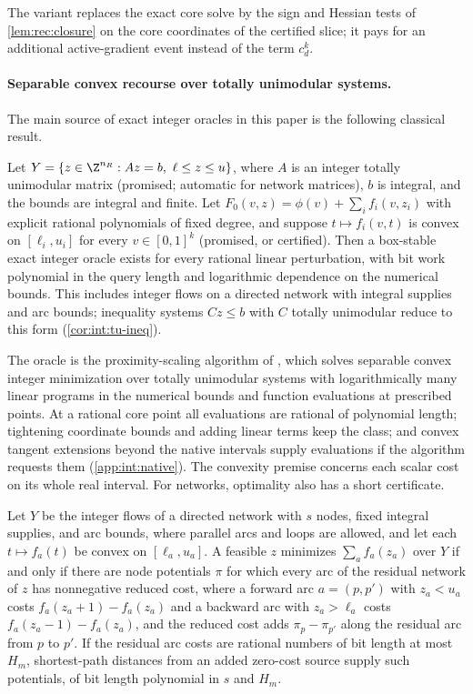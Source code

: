 The variant replaces the exact core solve by the sign and Hessian tests of
\cref{lem:rec:closure} on the core coordinates of the certified slice; it pays
for an additional active-gradient event instead of the term $c_d^k$.

\paragraph{Separable convex recourse over totally unimodular systems.}
The main source of exact integer oracles in this paper is the following
classical result.

\begin{proposition}\label{prop:int:hs}
Let $Y=\{z\in\Z^{n_R}:Az=b,\ \ell\le z\le u\}$, where $A$ is an integer
totally unimodular matrix (promised; automatic for network matrices), $b$ is
integral, and the bounds are integral and finite. Let
$F_0(v,z)=\phi(v)+\sum_if_i(v,z_i)$ with explicit rational polynomials of
fixed degree, and suppose $t\mapsto f_i(v,t)$ is convex on $[\ell_i,u_i]$ for
every $v\in[0,1]^k$ (promised, or certified). Then a box-stable exact integer
oracle exists for every rational linear perturbation, with bit work
polynomial in the query length and logarithmic dependence on the numerical
bounds. This includes integer flows on a directed network with integral
supplies and arc bounds; inequality systems $Cz\le b$ with $C$ totally
unimodular reduce to this form (\cref{cor:int:tu-ineq}).
\end{proposition}

The oracle is the proximity-scaling algorithm of
\citet[Theorem~4.3]{hochbaum1990-convex-separable-optimization-is-not}, which solves separable convex
integer minimization over totally unimodular systems with logarithmically
many linear programs in the numerical bounds and function evaluations at
prescribed points. At a rational core point all evaluations are rational of
polynomial length; tightening coordinate bounds and adding linear terms keep
the class; and convex tangent extensions beyond the native intervals supply
evaluations if the algorithm requests them
(\cref{app:int:native}). The convexity premise concerns each scalar cost on its
whole real interval. For networks, optimality also has a short certificate.

\begin{lemma}\label{lem:int:potentials}
Let $Y$ be the integer flows of a directed network with $s$ nodes, fixed
integral supplies, and arc bounds, where parallel arcs and loops are allowed,
and let each $t\mapsto f_a(t)$ be convex on $[\ell_a,u_a]$. A feasible $z$
minimizes $\sum_af_a(z_a)$ over $Y$ if and only if there are node potentials
$\pi$ for which every arc of the residual network of $z$ has nonnegative
reduced cost, where a forward arc $a=(p,p')$ with $z_a<u_a$ costs
$f_a(z_a+1)-f_a(z_a)$ and a backward arc with $z_a>\ell_a$ costs
$f_a(z_a-1)-f_a(z_a)$, and the reduced cost adds $\pi_p-\pi_{p'}$ along the
residual arc from $p$ to $p'$. If the residual arc costs are rational
numbers of bit length at most $H_m$, shortest-path distances from an added
zero-cost source supply such potentials, of bit length polynomial in $s$ and
$H_m$.
\end{lemma}

